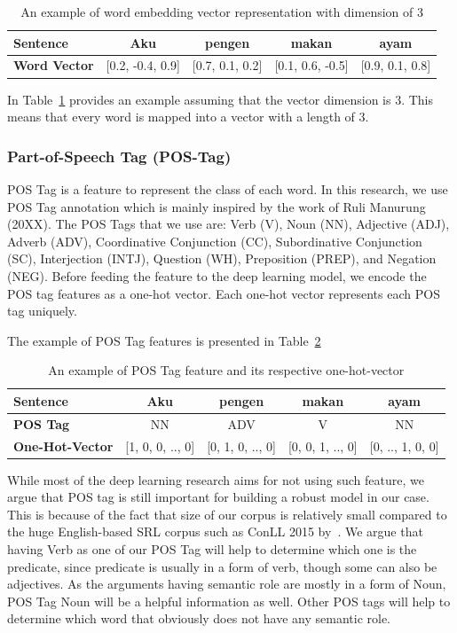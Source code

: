 \begin{table}
	\centering
	\caption{An example of word embedding vector representation with dimension of 3}
	\label{tab:examplewe}
	\begin{tabular}{|lcccc|}
		\hline
		\textbf{Sentence} 				& Aku & pengen & makan & ayam \\
		\hline
		\textbf{Word Vector}		& [0.2, -0.4, 0.9] & [0.7, 0.1, 0.2] & [0.1, 0.6, -0.5] & [0.9, 0.1, 0.8] \\
		\hline
	\end{tabular}
\end{table}

In Table~\ref{tab:examplewe} provides an example assuming that the vector dimension is 3. This means that every word is mapped into a vector with a length of 3.

\subsubsection{Part-of-Speech Tag (POS-Tag)}
POS Tag is a feature to represent the class of each word. In this research, we use POS Tag annotation which is mainly inspired by the work of Ruli Manurung (20XX). The POS Tags that we use are: Verb (V), Noun (NN), Adjective (ADJ), Adverb (ADV), Coordinative Conjunction (CC), Subordinative Conjunction (SC), Interjection (INTJ), Question (WH), Preposition (PREP), and Negation (NEG). Before feeding the feature to the deep learning model, we encode the POS tag features as a one-hot vector. Each one-hot vector represents each POS tag uniquely.

The example of POS Tag features is presented in Table~\ref{tab:examplepos}
\begin{table}
	\centering
	\caption{An example of POS Tag feature and its respective one-hot-vector}
	\label{tab:examplepos}
	\begin{tabular}{|lcccc|}
		\hline
		\textbf{Sentence} 				& Aku & pengen & makan & ayam \\
		\hline
		\textbf{POS Tag}				& NN & ADV & V & NN  \\
		\hline
		\textbf{One-Hot-Vector}		& [1, 0, 0, .., 0] & [0, 1, 0, .., 0] & [0, 0, 1, .., 0] & [0, .., 1, 0, 0] \\
		\hline
	\end{tabular}
\end{table}

While most of the deep learning research aims for not using such feature, we argue that POS tag is still important for building a robust model in our case. This is because of the fact that size of our corpus is relatively small compared to the huge English-based SRL corpus such as ConLL 2015 by~\cite{carreras2005introduction}. We argue that having Verb as one of our POS Tag will help to determine which one is the predicate, since predicate is usually in a form of verb, though some can also be adjectives. As the arguments having semantic role are mostly in a form of Noun, POS Tag Noun will be a helpful information as well. Other POS tags will help to determine which word that obviously does not have any semantic role.

